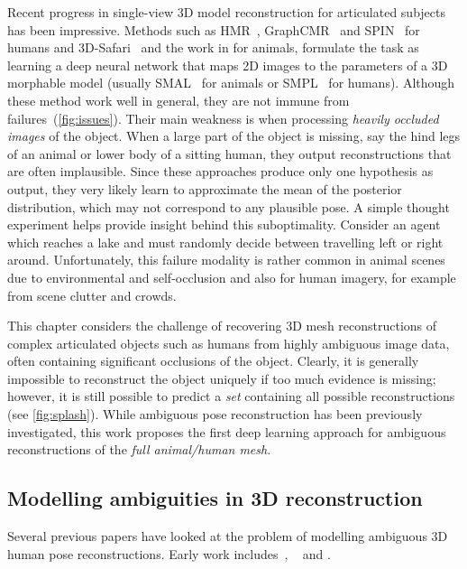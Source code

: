 Recent progress in single-view 3D model reconstruction for articulated subjects has been impressive.
Methods such as HMR~\citep{kanazawa18end-to-end}, GraphCMR~\citep{kolotouros19convolutional} and SPIN~\citep{kolotouros19learning} for humans and 3D-Safari~\cite{xxx} and the work in  for animals, formulate the task as learning a deep neural network that maps 2D images to the parameters of a 3D morphable model (usually SMAL~\cite{zuffi2017menagerie} for animals or SMPL~\cite{loper15smpl} for humans).
Although these method work well in general, they are not immune from failures~(\cref{fig:issues}).
Their main weakness is when processing \emph{heavily occluded images} of the object.
When a large part of the object is missing, say the hind legs of an animal or lower body of a sitting human, they output reconstructions that are often implausible.
Since these approaches produce only one hypothesis as output, they very likely learn to approximate the mean of the posterior distribution, which may not correspond to any plausible pose.
A simple thought experiment helps provide insight behind this suboptimality. Consider an agent which reaches a lake and must randomly decide between travelling left or right around. %
Unfortunately, this failure modality is rather common in animal scenes due to environmental and self-occlusion and also for human imagery, for example from scene clutter and crowds.

This chapter considers the challenge of recovering 3D mesh reconstructions of complex articulated objects such as humans from highly ambiguous image data, often containing significant occlusions of the object.
Clearly, it is generally impossible to reconstruct the object uniquely if too much evidence is missing; however, it is still possible to predict a \emph{set} containing all possible reconstructions (see \cref{fig:splash}).
While ambiguous pose reconstruction has been previously investigated, this work proposes the first deep learning approach for ambiguous reconstructions of the \emph{full animal/human mesh}.



\subsection{Modelling ambiguities in 3D reconstruction}

Several previous papers have looked at the problem of modelling ambiguous 3D human pose reconstructions. Early work includes~\citet{kinematic-jump-processes}, ~\citet{tracking-3d-human-figures} and \citet{density-prop}. %

